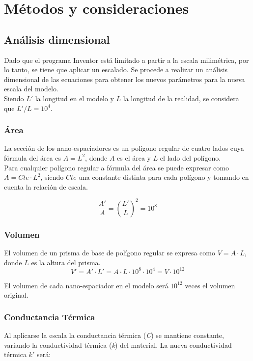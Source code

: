 \chapter{Métodos y consideraciones}

\section{Análisis dimensional}
Dado que el programa Inventor está limitado a partir a la escala milimétrica, por lo tanto, se tiene que aplicar un escalado. Se procede a realizar un análisis dimensional de las ecuaciones para obtener los nuevos parámetros para la nueva escala del modelo.\\

Siendo $L'$ la longitud en el modelo y $L$ la longitud de la realidad, se considera que ${L'}/{L}=10^4$.
\subsection{Área}
La sección de los nano-espaciadores es un polígono regular de cuatro lados cuya fórmula del área es $A=L^2$, donde $A$ es el área y $L$ el lado del polígono.\\

Para cualquier polígono regular a fórmula del área se puede expresar como $A=Cte\cdot L^2$, siendo $Cte$ una constante distinta para cada polígono y tomando en cuenta la relación de escala.

\begin{equation}
	\dfrac{A'}{A}=\left(\dfrac{L'}{L}\right)^2=10^8
\end{equation}
\subsection{Volumen}
El volumen de un prisma de base de polígono regular se expresa como $V=A\cdot L$, donde $L$ es la altura del prisma.
\begin{equation}
	V'=A'\cdot L' = A\cdot L \cdot 10^8\cdot 10^4= V\cdot 10^12
\end{equation}

El volumen de cada nano-espaciador en el modelo será $10^12$ veces el volumen original.
\subsection{Conductancia Térmica}

Al aplicarse la escala la conductancia térmica (\textit{C}) se mantiene constante, variando la conductividad térmica (\textit{k}) del material. La nueva conductividad térmica $k'$ será:

